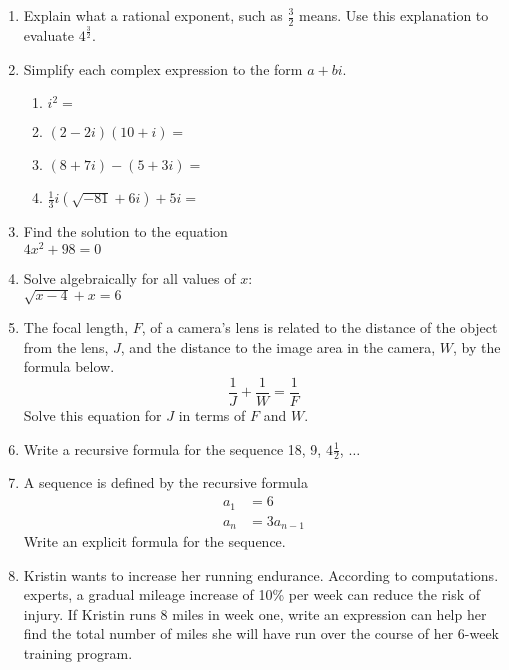 \documentclass[12pt, twoside]{article}
\begin{document}
\begin{enumerate}[itemsep=0.5cm]
\item Explain what a rational exponent, such as $\frac{3}{2}$ means. Use this explanation to evaluate $\displaystyle 4^{\frac{3}{2}}$. \vspace{3cm}

\item Simplify each complex expression to the form $a+bi$.
    \begin{multicols}{2}
    \begin{enumerate}[itemsep=2cm]
        \item $i^2=$
        \item $(2-2i)(10+i)=$
        \item $(8+7i) - (5+3i)=$
        \item $\displaystyle \frac{1}{3} i (\sqrt{-81}+6i) + 5i=$
    \end{enumerate}
    \end{multicols} \vspace{3cm}

\newpage
\item Find the solution to the equation \\[0.25cm]
$4x^2+98=0$
\vspace{5cm}

\item Solve algebraically for all values of $x$: \\[0.25cm]
$\sqrt{x-4} +x=6$ \vspace{5cm} %

\item The focal length, $F$, of a camera's lens is related to the distance of
the object from the lens, $J$, and the distance to the image area in the
camera, $W$, by the formula below.
$$\displaystyle \frac{1}{J}+\frac{1}{W} = \frac{1}{F}$$
Solve this equation for $J$ in terms of $F$ and $W$.

\newpage
\item Write a recursive formula for the sequence 18, 9, $4 \frac{1}{2}$, $\ldots$ \vspace{2cm}

\item A sequence is defined by the recursive formula
\begin{align*}
a_1 &= 6 \\
a_{n} &= 3a_{n-1}
\end{align*}
Write an explicit formula for the sequence. \vspace{2cm}


\item Kristin wants to increase her running endurance. According to computations. experts, a gradual mileage increase of 10\% per week can reduce the risk of injury. If Kristin runs 8 miles in week one, write an expression can help her find the total number of miles she will have run over the course of her 6-week training program. \vspace{2cm} %


\end{enumerate}
\end{document}
